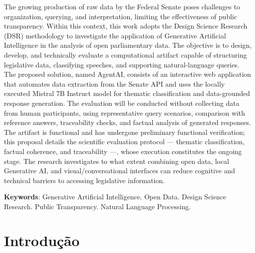 \documentclass[
    12pt,
    oneside,
    a4paper,
    english,
    brazil,
    sumario=tradicional,
    msc
]{dcomp-abntex2}
\begin{document}
\begin{resumo}[Abstract]
The growing production of raw data by the Federal Senate poses challenges to organization, querying, and interpretation, limiting the effectiveness of public transparency. Within this context, this work adopts the Design Science Research (DSR) methodology to investigate the application of Generative Artificial Intelligence in the analysis of open parliamentary data. The objective is to design, develop, and technically evaluate a computational artifact capable of structuring legislative data, classifying speeches, and supporting natural-language queries. The proposed solution, named AgentAI, consists of an interactive web application that automates data extraction from the Senate API and uses the locally executed Mistral 7B Instruct model for thematic classification and data-grounded response generation. The evaluation will be conducted without collecting data from human participants, using representative query scenarios, comparison with reference answers, traceability checks, and factual analysis of generated responses. The artifact is functional and has undergone preliminary functional verification; this proposal details the scientific evaluation protocol --- thematic classification, factual coherence, and traceability ---, whose execution constitutes the ongoing stage. The research investigates to what extent combining open data, local Generative AI, and visual/conversational interfaces can reduce cognitive and technical barriers to accessing legislative information.

\textbf{Keywords}: Generative Artificial Intelligence. Open Data. Design Science Research. Public Transparency. Natural Language Processing.
\end{resumo}


\cleardoublepage
\listoffigures*

\cleardoublepage
\listofquadros*

\cleardoublepage
\tableofcontents*


\chapter{Introdução}

\end{document}
